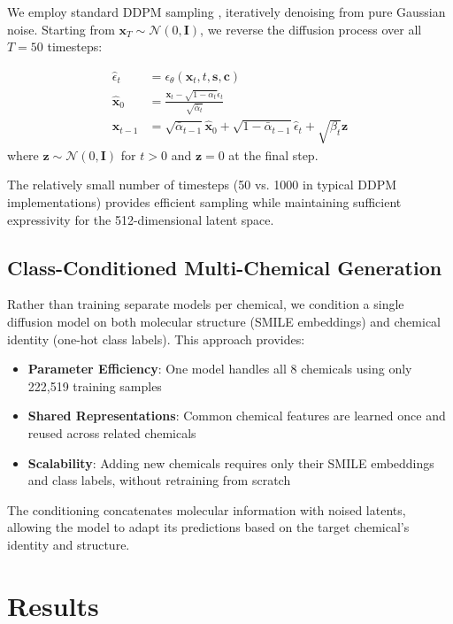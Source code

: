 \documentclass[sigconf]{acmart}
\begin{document}
We employ standard DDPM sampling \cite{ho2020denoising}, iteratively denoising from pure Gaussian noise. Starting from $\mathbf{x}_T \sim \mathcal{N}(0, \mathbf{I})$, we reverse the diffusion process over all $T=50$ timesteps:

\begin{align}
\hat{\epsilon}_t &= \epsilon_\theta(\mathbf{x}_t, t, \mathbf{s}, \mathbf{c}) \\
\hat{\mathbf{x}}_0 &= \frac{\mathbf{x}_t - \sqrt{1-\bar{\alpha}_t}\hat{\epsilon}_t}{\sqrt{\bar{\alpha}_t}} \\
\mathbf{x}_{t-1} &= \sqrt{\bar{\alpha}_{t-1}}\hat{\mathbf{x}}_0 + \sqrt{1-\bar{\alpha}_{t-1}}\hat{\epsilon}_t + \sqrt{\beta_t}\mathbf{z}
\end{align}
where $\mathbf{z} \sim \mathcal{N}(0, \mathbf{I})$ for $t > 0$ and $\mathbf{z} = 0$ at the final step.

The relatively small number of timesteps (50 vs. 1000 in typical DDPM implementations) provides efficient sampling while maintaining sufficient expressivity for the 512-dimensional latent space.

\subsection{Class-Conditioned Multi-Chemical Generation}

Rather than training separate models per chemical, we condition a single diffusion model on both molecular structure (SMILE embeddings) and chemical identity (one-hot class labels). This approach provides:

\begin{itemize}
    \item \textbf{Parameter Efficiency}: One model handles all 8 chemicals using only 222,519 training samples
    \item \textbf{Shared Representations}: Common chemical features are learned once and reused across related chemicals
    \item \textbf{Scalability}: Adding new chemicals requires only their SMILE embeddings and class labels, without retraining from scratch
\end{itemize}

The conditioning concatenates molecular information with noised latents, allowing the model to adapt its predictions based on the target chemical's identity and structure.

\section{Results}
\end{document}
